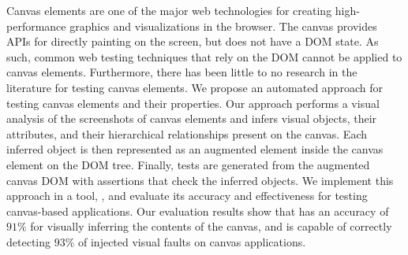 Canvas elements are one of the major web technologies for creating high-performance graphics and visualizations in the browser. The canvas provides APIs for directly painting on the screen, but does not have a DOM state. As such, common web testing techniques that rely on the DOM cannot be applied to canvas elements. Furthermore, there has been little to no research in the literature for testing canvas elements. We propose an automated approach for testing canvas elements and their properties. Our approach performs a visual analysis of the screenshots of canvas elements and infers visual objects, their attributes, and their hierarchical relationships present on the canvas. Each inferred object is then represented as an augmented element inside the canvas element on the DOM tree. Finally, tests are generated from the augmented canvas DOM with assertions that check the inferred objects. We implement this approach in a tool, \tool, and evaluate its accuracy and effectiveness for testing canvas-based applications. Our evaluation results show that \tool has an accuracy of $91 \%$ for visually inferring the contents of the canvas, and is capable of correctly detecting $93 \%$ of injected visual faults on canvas applications.

